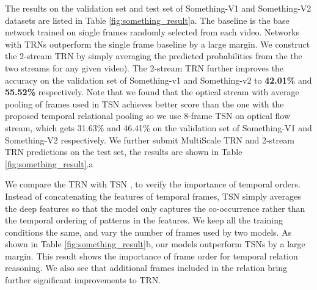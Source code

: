 \documentclass[runningheads]{llncs}
\begin{document}
The results on the validation set and test set of Something-V1 and Something-V2 datasets are listed in Table \ref{fig:something_result}a. The baseline is the base network trained on single frames randomly selected from each video. Networks with TRNs outperform the single frame baseline by a large margin. We construct the 2-stream TRN by simply averaging the predicted probabilities from the the two streams for any given video). The 2-stream TRN further improves the accuracy on the validation set of Something-v1 and Something-v2 to \textbf{42.01\%} and \textbf{55.52\%} respectively. Note that we found that the optical stream with average pooling of frames used in TSN \cite{wang2016temporal} achieves better score than the one with the proposed temporal relational pooling so we use 8-frame TSN on optical flow stream, which gets 31.63\% and 46.41\% on the validation set of Something-V1 and Something-V2 respectively. We further submit MultiScale TRN and 2-stream TRN predictions on the test set, the results are shown in Table \ref{fig:something_result}.a 

We compare the TRN with TSN \cite{wang2016temporal}, to verify the importance of temporal orders. Instead of concatenating the features of temporal frames, TSN simply averages the deep features so that the model only captures the co-occurrence rather than the temporal ordering of patterns in the features. We keep all the training conditions the same, and vary the number of frames used by two models. As shown in Table \ref{fig:something_result}b, our models outperform TSNs by a large margin. This result shows the importance of frame order for temporal relation reasoning. We also see that additional frames included in the relation bring further significant improvements to TRN.
\end{document}

